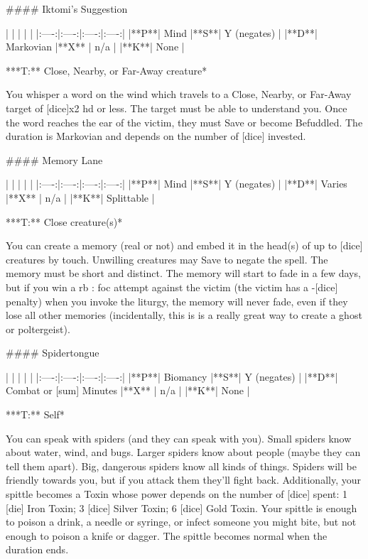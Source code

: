 #### Iktomi's Suggestion

| | | | |
|:----:|:----:|:----:|:----:|
|**P**| Mind |**S**|  Y (negates) |
|**D**| Markovian |**X** |  n/a  |
|**K**| None |


***T:**   Close, Nearby, or Far-Away creature*



You whisper a word on the wind which travels to a Close, Nearby, or Far-Away target of [dice]x2 {hd} or less. The target must be able to understand you.  Once the word reaches the ear of the victim, they must Save or become Befuddled.  The duration is Markovian and depends on the number of [dice] invested.




#### Memory Lane

| | | | |
|:----:|:----:|:----:|:----:|
|**P**| Mind |**S**|  Y (negates) |
|**D**| Varies |**X** |  n/a  |
|**K**| Splittable |


***T:**   Close creature(s)*



You can create a memory (real or not) and embed it in the head(s) of up to [dice] creatures by touch.  Unwilling creatures may Save to negate the spell.  The memory must be short and distinct.  The memory will start to fade in a few days, but if you win a {rb} : {foc} attempt against the victim (the victim has a -[dice] penalty) when you invoke the liturgy, the memory will never fade, even if they lose all other memories (incidentally, this is is a really great way to create a ghost or poltergeist).





#### Spidertongue

| | | | |
|:----:|:----:|:----:|:----:|
|**P**| Biomancy |**S**|  Y (negates) |
|**D**| Combat or [sum] Minutes |**X** |  n/a  |
|**K**| None |


***T:**   Self*



You can speak with spiders (and they can speak with you).  Small spiders know about water, wind, and bugs.  Larger spiders know about people (maybe they can tell them apart).  Big, dangerous spiders know all kinds of things.  Spiders will be friendly towards you, but if you attack them they'll fight back.  Additionally, your spittle becomes a Toxin whose power depends on the number of [dice] spent: 1 [die] Iron Toxin; 3 [dice] Silver Toxin; 6 [dice] Gold Toxin.  Your spittle is enough to poison a drink, a needle or syringe, or infect someone you might bite, but not enough to poison a knife or dagger.  The spittle becomes normal when the duration ends.

